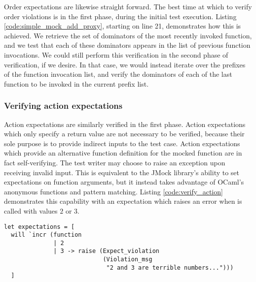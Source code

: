 Order expectations are likewise straight forward. The best time at
which to verify order violations is in the first phase, during the
initial test execution. Listing \ref{code:simple_mock_add_proxy},
starting on line 21, demonstrates how this is achieved. We retrieve
the set of dominators of the most recently invoked function, and we
test that each of these dominators appears in the list of previous
function invocations. We could still perform this verification in the
second phase of verification, if we desire. In that case, we would
instead iterate over the prefixes of the function invocation list, and
verify the dominators of each of the last function to be invoked in
the current prefix list.

\subsubsection{Verifying action expectations}

Action expectations are similarly verified in the first phase. Action
expectations which only specify a return value are not necessary to be
verified, because their sole purpose is to provide indirect inputs to
the test case. Action expectations which provide an alternative
function definition for the mocked function are in fact
self-verifying. The test writer may choose to raise an
 exception upon receiving invalid input. This
is equivalent to the JMock library's ability to set expectations on
function arguments, but it instead takes advantage of OCaml's anonymous
functions and pattern matching. Listing \ref{code:verify_action}
demonstrates this capability with an expectation which raises an error
when  is called with values $2$ or $3$.

\begin{lstlisting}[aboveskip=\baselineskip,
    caption=An action expectation example,
    label=code:verify_action]
let expectations = [
  will `incr (function
              | 2
              | 3 -> raise (Expect_violation
                            (Violation_msg
                             "2 and 3 are terrible numbers...")))
  ]
\end{lstlisting}




